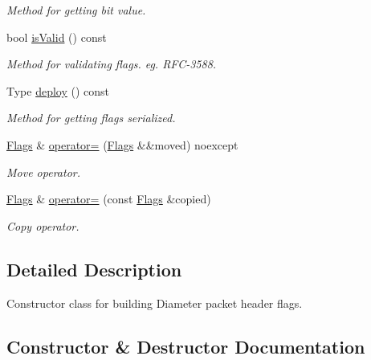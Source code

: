 \begin{DoxyCompactItemize}
\begin{DoxyCompactList}\small\item\em Method for getting bit value. \end{DoxyCompactList}\item 
bool \hyperlink{classDiameter_1_1Packet_1_1Header_1_1Flags_ae577fd786c656522b958395fb140dd8d}{is\+Valid} () const
\begin{DoxyCompactList}\small\item\em Method for validating flags. eg. R\+F\+C-\/3588. \end{DoxyCompactList}\item 
Type \hyperlink{classDiameter_1_1Packet_1_1Header_1_1Flags_a6bb796dff7f3e8f128262fb2d3a549bb}{deploy} () const
\begin{DoxyCompactList}\small\item\em Method for getting flags serialized. \end{DoxyCompactList}\item 
\hyperlink{classDiameter_1_1Packet_1_1Header_1_1Flags}{Flags} \& \hyperlink{classDiameter_1_1Packet_1_1Header_1_1Flags_afd99abaebff289fdc859696929fea0da}{operator=} (\hyperlink{classDiameter_1_1Packet_1_1Header_1_1Flags}{Flags} \&\&moved) noexcept
\begin{DoxyCompactList}\small\item\em Move operator. \end{DoxyCompactList}\item 
\hyperlink{classDiameter_1_1Packet_1_1Header_1_1Flags}{Flags} \& \hyperlink{classDiameter_1_1Packet_1_1Header_1_1Flags_ad83a50d504d49462093a515681b0d7b6}{operator=} (const \hyperlink{classDiameter_1_1Packet_1_1Header_1_1Flags}{Flags} \&copied)
\begin{DoxyCompactList}\small\item\em Copy operator. \end{DoxyCompactList}\end{DoxyCompactItemize}


\subsection{Detailed Description}
Constructor class for building Diameter packet header flags. 

\subsection{Constructor \& Destructor Documentation}
\mbox{\label{classDiameter_1_1Packet_1_1Header_1_1Flags_a76ab5597a6d9a396bb810f8ac8ebbfce}} 
